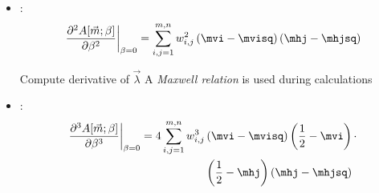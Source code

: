 \begin{frame}
  \begin{itemize}
    \item<1-> :
    \[
      \left.\frac{\partial^2A{\left[\vec{m};\beta\right]}}{\partial\beta^2}\right|_{\beta=0}
      =\sum_{i,j=1}^{m,n} w_{i,j}^2\left(\mvi-\mvisq\right)\left(\mhj-\mhjsq\right)
    \]
    \begin{alertblock}{Compute derivative of \(\vec{\lambda}\)}
      A \emph{Maxwell relation} is used during calculations
    \end{alertblock}
    \item<2-> :
    \begin{align*}
    \left.\frac{\partial^3A{\left[\vec{m};\beta\right]}}{\partial\beta^3}\right|_{\beta=0}
    = 4 \sum_{i,j=1}^{m,n} w_{i,j}^3&\left(\mvi-\mvisq\right) \left(\frac{1}{2}-\mvi\right) \cdot\\
    &\left(\frac{1}{2}-\mhj\right) \left(\mhj-\mhjsq\right)
    \end{align*}
  \end{itemize}
\end{frame}

